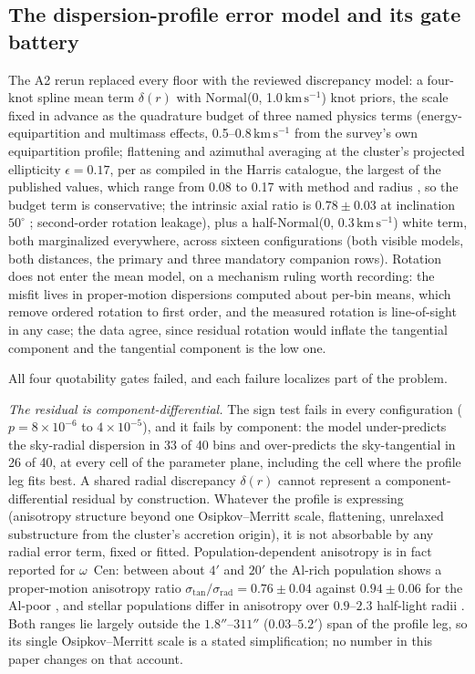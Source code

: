 \documentclass[11pt]{article}
\newcommand{\ocen}{$\omega$~Cen}
\newcommand{\kms}{\ensuremath{\mathrm{km\,s^{-1}}}}
\begin{document}
\begin{figure}[tbp]
\label{fig:ladder}
\end{figure}

\subsection{The dispersion-profile error model and its gate battery}
\label{sec:fit2}

The A2 rerun replaced every floor with the reviewed discrepancy model: a four-knot spline mean term $\delta(r)$ with Normal(0, 1.0\,\kms) knot priors, the scale fixed in advance as the quadrature budget of three named physics terms (energy-equipartition and multimass effects, 0.5--0.8\,\kms{} from the survey's own equipartition profile; flattening and azimuthal averaging at the cluster's projected ellipticity $\epsilon = 0.17$, per \citealt{WhiteShawl1987} as compiled in the Harris catalogue, the largest of the published values, which range from 0.08 to 0.17 with method and radius \citep{Geyer1983,Pancino2003}, so the budget term is conservative; the intrinsic axial ratio is $0.78\pm0.03$ at inclination $50^\circ$ \citep{vandeVen2006}; second-order rotation leakage), plus a half-Normal(0, 0.3\,\kms) white term, both marginalized everywhere, across sixteen configurations (both visible models, both distances, the primary and three mandatory companion rows). Rotation does not enter the mean model, on a mechanism ruling worth recording: the misfit lives in proper-motion dispersions computed about per-bin means, which remove ordered rotation to first order, and the measured rotation is line-of-sight in any case; the data agree, since residual rotation would inflate the tangential component and the tangential component is the low one.

All four quotability gates failed, and each failure localizes part of the problem.

\emph{The residual is component-differential.} The sign test fails in every configuration ($p = 8\times10^{-6}$ to $4\times10^{-5}$), and it fails by component: the model under-predicts the sky-radial dispersion in 33 of 40 bins and over-predicts the sky-tangential in 26 of 40, at every cell of the parameter plane, including the cell where the profile leg fits best. A shared radial discrepancy $\delta(r)$ cannot represent a component-differential residual by construction. Whatever the profile is expressing (anisotropy structure beyond one Osipkov--Merritt scale, flattening, unrelaxed substructure from the cluster's accretion origin), it is not absorbable by any radial error term, fixed or fitted. Population-dependent anisotropy is in fact reported for \ocen{}: between about $4'$ and $20'$ the Al-rich population shows a proper-motion anisotropy ratio $\sigma_{\mathrm{tan}}/\sigma_{\mathrm{rad}} = 0.76 \pm 0.04$ against $0.94 \pm 0.06$ for the Al-poor \citep{Pagnini2026}, and stellar populations differ in anisotropy over $0.9$--$2.3$ half-light radii \citep{Ziliotto2025}. Both ranges lie largely outside the $1.8''$--$311''$ ($0.03$--$5.2'$) span of the profile leg, so its single Osipkov--Merritt scale is a stated simplification; no number in this paper changes on that account.
\end{document}
